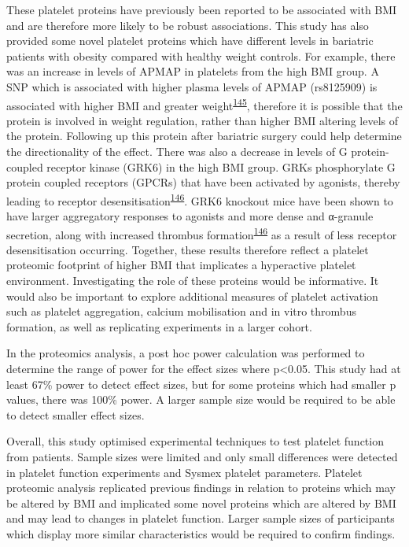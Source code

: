 \documentclass[11pt,twoside]{bristolthesis}
\begin{document}
These platelet proteins have previously been reported to be associated with BMI and are therefore more likely to be robust associations. This study has also provided some novel platelet proteins which have different levels in bariatric patients with obesity compared with healthy weight controls. For example, there was an increase in levels of APMAP in platelets from the high BMI group. A SNP which is associated with higher plasma levels of APMAP (rs8125909) is associated with higher BMI and greater weight\textsuperscript{\protect\hyperlink{ref-Liu2021}{145}}, therefore it is possible that the protein is involved in weight regulation, rather than higher BMI altering levels of the protein. Following up this protein after bariatric surgery could help determine the directionality of the effect. There was also a decrease in levels of G protein-coupled receptor kinase (GRK6) in the high BMI group. GRKs phosphorylate G protein coupled receptors (GPCRs) that have been activated by agonists, thereby leading to receptor desensitisation\textsuperscript{\protect\hyperlink{ref-Chaudhary2020}{146}}. GRK6 knockout mice have been shown to have larger aggregatory responses to agonists and more dense and α-granule secretion, along with increased thrombus formation\textsuperscript{\protect\hyperlink{ref-Chaudhary2020}{146}} as a result of less receptor desensitisation occurring. Together, these results therefore reflect a platelet proteomic footprint of higher BMI that implicates a hyperactive platelet environment. Investigating the role of these proteins would be informative. It would also be important to explore additional measures of platelet activation such as platelet aggregation, calcium mobilisation and in vitro thrombus formation, as well as replicating experiments in a larger cohort.

In the proteomics analysis, a post hoc power calculation was performed to determine the range of power for the effect sizes where p\textless0.05. This study had at least 67\% power to detect effect sizes, but for some proteins which had smaller p values, there was 100\% power. A larger sample size would be required to be able to detect smaller effect sizes.

Overall, this study optimised experimental techniques to test platelet function from patients. Sample sizes were limited and only small differences were detected in platelet function experiments and Sysmex platelet parameters. Platelet proteomic analysis replicated previous findings in relation to proteins which may be altered by BMI and implicated some novel proteins which are altered by BMI and may lead to changes in platelet function. Larger sample sizes of participants which display more similar characteristics would be required to confirm findings.
\end{document}
